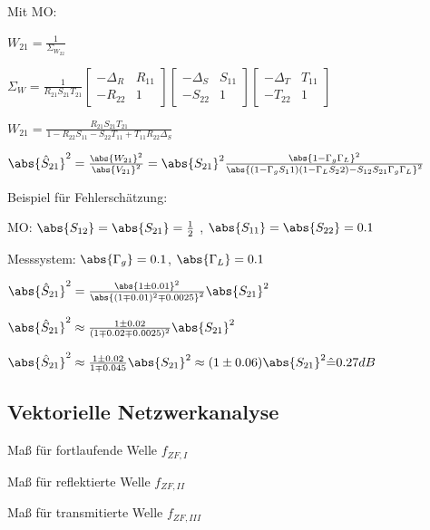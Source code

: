 \begin{pitemize}
\begin{pitemize}
    \end{pitemize}
    \item Mit MO:
    \begin{pitemize}
        \item {}
        \item $W_{21} = \frac{1}{\Sigma_{W_{22}}}$
        \item $\Sigma_W = \frac{1}{R_{21}S_{21}T_{21}} \begin{bmatrix}-\Delta_R & R_{11} \\ -R_{22} & 1\end{bmatrix}\begin{bmatrix}-\Delta_S & S_{11} \\ -S_{22} & 1\end{bmatrix}\begin{bmatrix}-\Delta_T & T_{11} \\ -T_{22} & 1\end{bmatrix}$
        \item $W_{21} = \frac{R_{21}S_{21}T_{21}}{1 - R_{22}S_{11} - S_{22}T_{11} + T_{11}R_{22}\Delta_S}$
        \item $\abs{\hat{S}_{21}}^2 = \frac{\abs{W_{21}}^2}{\abs{V_{21}}^2} = \abs{S_{21}}^2 \frac{\abs{1 - \Gamma_g \Gamma_L}^2}{\abs{(1- \Gamma_g S_11)(1- \Gamma_L S_22) - S_{12}S_{21} \Gamma_g \Gamma_L}^2}$
    \end{pitemize}
    \item Beispiel für Fehlerschätzung:
    \begin{pitemize}
        \item MO: $\abs{S_{12}} = \abs{S_{21}} = \frac{1}{2}$ , $\abs{S_{11}} = \abs{S_{22}} = 0.1$
        \item Messsystem: $\abs{\Gamma_g} = 0.1$, $\abs{\Gamma_L} = 0.1$
        \item $\abs{\hat{S}_{21}}^2 = \frac{\abs{1 \pm 0.01}^2}{\abs{(1 \mp 0.01)^2 \mp 0.0025}^2} \abs{S_{21}}^2$
        \item $\abs{\hat{S}_{21}}^2 \approx \frac{1 \pm 0.02}{(1 \mp 0.02 \mp 0.0025)^2} \abs{S_{21}}^2$
        \item $\abs{\hat{S}_{21}}^2 \approx \frac{1 \pm 0.02}{1 \mp 0.045} \abs{S_{21}}^2 \approx (1 \pm 0.06) \abs{S_{21}}^2 \hat{=} 0.27 dB$
    \end{pitemize}
\end{pitemize}



\subsection{Vektorielle Netzwerkanalyse}


\begin{pitemize}
    \item Maß für fortlaufende Welle $f_{ZF, I}$
    \item Maß für reflektierte Welle $f_{ZF, II}$
    \item Maß für transmitierte Welle $f_{ZF, III}$
    \item {}
\end{pitemize}